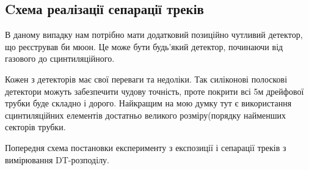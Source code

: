 	\subsection{ Cхема реалізації сепарації треків}
	
	В даному випадку нам потрібно мати додатковий позиційно чутливий детектор, що реєстрував би мюон. Це може бути будь’який детектор, починаючи від газового до сцинтиляційного.
	

	Кожен з детекторів має свої переваги та недоліки. Так силіконові полоскові детектори можуть забезпечити чудову точність, проте покрити всі 5м дрейфової трубки буде складно і дорого. Найкращим на мою думку тут є використання сцинтиляційних елементів достатньо великого розміру(порядку найменших секторів трубки.

	Попередня схема постановки експерименту з експозиції і сепарації треків з вимірювання DT-розподілу.	
	
